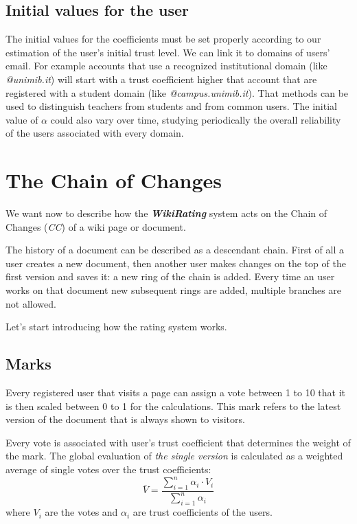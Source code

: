 \documentclass[a4paper,11pt]{article}
\newcommand{\wir}{\textbf{\textit{WikiRating }}}
\newcommand{\al}{$\alpha$ }
\begin{document}
\subsection{Initial values for the user}
The initial values for the coefficients must be set properly according to our estimation 
of the user's initial trust level. We can link it to domains of users' email. For example 
accounts that use a recognized institutional domain (like \textit{@unimib.it}) will start 
with a trust coefficient higher that account that are registered with a student domain 
(like \textit{@campus.unimib.it}). That methods can be used to distinguish teachers from 
students and from common users. The initial value of \al could also vary over time, 
studying periodically the overall reliability of the users associated with every domain.

\newpage
\section{The Chain of Changes}\label{sec:chch}
We want now to describe how the \wir system acts on the Chain of Changes (\textit{CC}) 
of a wiki page or document.

The history of a document can be described as a descendant chain. First of all a user 
creates a new document, then another user makes changes on the top of the first version and saves it: a new ring of the chain is added. Every time an user works on that document  
new subsequent rings are added, multiple branches are not allowed.

Let's start introducing how the rating system works.

\subsection{Marks} \label{sec:marks}
Every registered user that visits a page can assign a vote between 1 to 10 
that it is then scaled between 0 to 1 for the calculations. This mark refers to the latest version of the document that is  always shown to visitors.

 Every vote is associated with user's trust coefficient that determines the weight of the mark. The global evaluation of \emph{the single version} is calculated as a weighted 
 average of single votes over the trust coefficients:
\begin{equation} \label{eq:v_medio}
\bar{V} = \frac{\displaystyle{\sum_{i=1}^n \alpha_i \cdot V_i}}{\displaystyle{\sum_{i=1}^n \alpha_i}}
\end{equation}
where $V_i$ are the votes and $\alpha_i$ are trust coefficients of the users.
\end{document}
